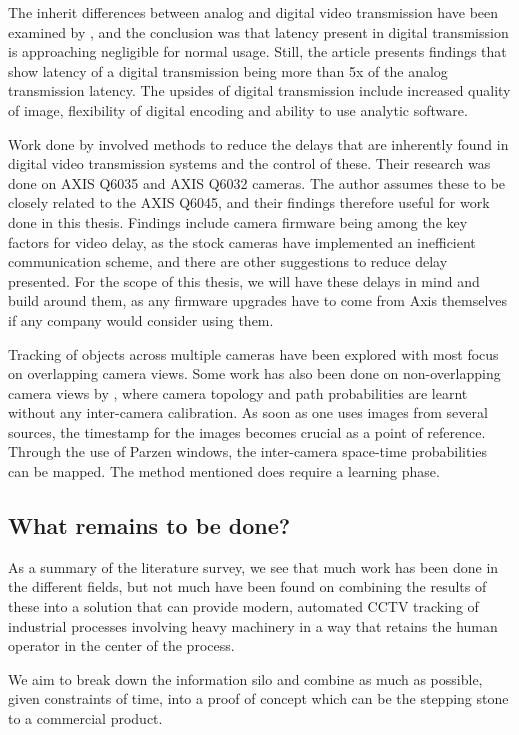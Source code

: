 The inherit differences between analog and digital video transmission have been examined by \citet{hill10}, and the conclusion was that latency present in digital transmission is approaching negligible for normal usage. Still, the article presents findings that show latency of a digital transmission being more than 5x of the analog transmission latency. The upsides of digital transmission include increased quality of image, flexibility of digital encoding and ability to use analytic software.

Work done by \citet{svensson13} involved methods to reduce the delays that are inherently found in digital video transmission systems and the control of these. Their research was done on AXIS Q6035 and AXIS Q6032 cameras. The author assumes these to be closely related to the AXIS Q6045, and their findings therefore useful for work done in this thesis. Findings include camera firmware being among the key factors for video delay, as the stock cameras have implemented an inefficient communication scheme, and there are other suggestions to reduce delay presented. For the scope of this thesis, we will have these delays in mind and build around them, as any firmware upgrades have to come from Axis themselves if any company would consider using them.

Tracking of objects across multiple cameras have been explored with most focus on overlapping camera views. Some work has also been done on non-overlapping camera views by \citet{javed03}, where camera topology and path probabilities are learnt without any inter-camera calibration. As soon as one uses images from several sources, the timestamp for the images becomes crucial as a point of reference. Through the use of Parzen windows, the inter-camera space-time probabilities can be mapped. The method mentioned does require a learning phase.

\subsection{What remains to be done?}
As a summary of the literature survey, we see that much work has been done in the different fields, but not much have been found on combining the results of these into a solution that can provide modern, automated CCTV tracking of industrial processes involving heavy machinery in a way that retains the human operator in the center of the process.

We aim to break down the information silo and combine as much as possible, given constraints of time, into a proof of concept which can be the stepping stone to a commercial product.

